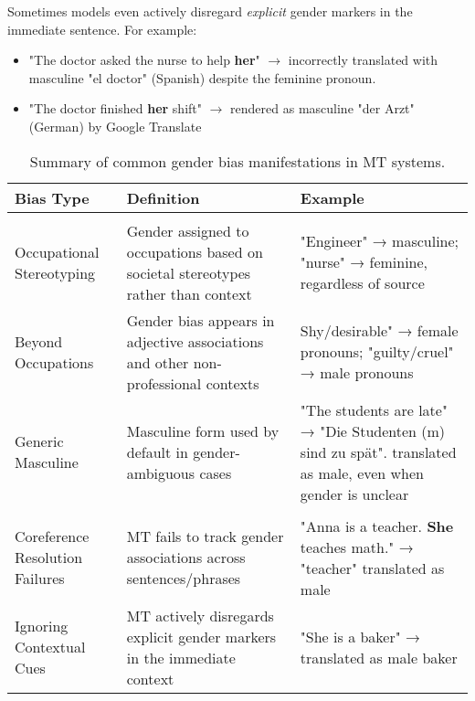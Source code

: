 Sometimes models even actively disregard \textit{explicit} gender markers in the immediate sentence. For example:
\begin{itemize}
    \item "The doctor asked the nurse to help \textbf{her}" $\rightarrow$ incorrectly translated with masculine "el doctor" (Spanish) despite the feminine pronoun.
    \item "The doctor finished \textbf{her} shift" $\rightarrow$ rendered as masculine "der Arzt" (German) by Google Translate \citep{stanovskyEvaluatingGenderBias2019}
\end{itemize}

\begin{table}[ht]
\centering
\begin{tabularx}{\textwidth}{>{\raggedright\arraybackslash}p{3cm} >{\raggedright\arraybackslash}X >{\raggedright\arraybackslash}X}
\toprule
\textbf{Bias Type} & \textbf{Definition} & \textbf{Example} \\
\midrule
\multicolumn{3}{l}{\textbf{Stereotype-Driven Biases}} \\
\midrule
Occupational Stereotyping & Gender assigned to occupations based on societal stereotypes rather than context & "Engineer" → masculine; "nurse" → feminine, regardless of source \\
\addlinespace
Beyond Occupations & Gender bias appears in adjective associations and other non-professional contexts & Shy/desirable" → female pronouns; "guilty/cruel" → male pronouns \\
\addlinespace
Generic Masculine & Masculine form used by default in gender-ambiguous cases & "The students are late" → "Die Studenten (m) sind zu spät". translated as male, even when gender is unclear \\
\midrule
\multicolumn{3}{l}{\textbf{Contextual Failures}} \\
\midrule
Coreference Resolution Failures & MT fails to track gender associations across sentences/phrases & "Anna is a teacher. \textbf{She} teaches math." → "teacher" translated as male \\
\addlinespace
Ignoring Contextual Cues & MT actively disregards explicit gender markers in the immediate context & "She is a baker" → translated as male baker \\
\bottomrule
\end{tabularx}
\caption{Summary of common gender bias manifestations in MT systems.}
\label{tab:gender_biases}
\end{table}


